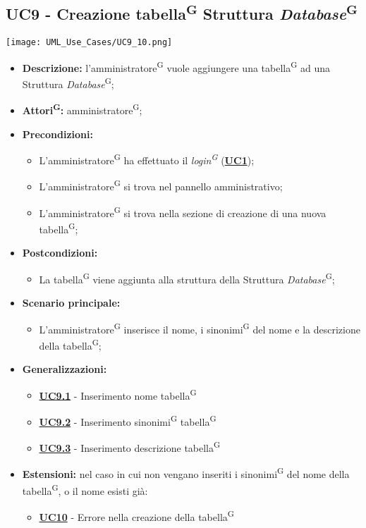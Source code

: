 \subsection{UC9 - Creazione tabella\textsuperscript{G} Struttura \textit{Database}\textsuperscript{G}}
\label{sec:UC9}
\texttt{[image: UML\_Use\_Cases/UC9\_10.png]}
\begin{itemize}
	\item \textbf{Descrizione:} l’amministratore\textsuperscript{G} vuole aggiungere una tabella\textsuperscript{G} ad una Struttura \textit{Database}\textsuperscript{G};
	\item \textbf{Attori\textsuperscript{G}:} amministratore\textsuperscript{G};
	\item \textbf{Precondizioni:} 
	\begin{itemize}
		\item L’amministratore\textsuperscript{G} ha effettuato il \textit{login\textsuperscript{G}} (\hyperref[sec:UC1]{\textbf{UC1}});
		\item L’amministratore\textsuperscript{G} si trova nel pannello amministrativo;
		\item L’amministratore\textsuperscript{G} si trova nella sezione di creazione di una nuova tabella\textsuperscript{G};
	\end{itemize}
	\item \textbf{Postcondizioni:} 
	\begin{itemize}
		\item La tabella\textsuperscript{G} viene aggiunta alla struttura della Struttura \textit{Database}\textsuperscript{G};
	\end{itemize}
	\item \textbf{Scenario principale:} 
	\begin{itemize}
		\item L’amministratore\textsuperscript{G} inserisce il nome, i sinonimi\textsuperscript{G} del nome e la descrizione della tabella\textsuperscript{G};
	\end{itemize}
	\item \textbf{Generalizzazioni:} 
	\begin{itemize}
		\item \hyperref[sec:UC9.1]{\textbf{UC9.1}} - Inserimento nome tabella\textsuperscript{G}
		\item \hyperref[sec:UC9.2]{\textbf{UC9.2}} - Inserimento sinonimi\textsuperscript{G} tabella\textsuperscript{G}
		\item \hyperref[sec:UC9.3]{\textbf{UC9.3}} - Inserimento descrizione tabella\textsuperscript{G}
	\end{itemize}
	\item \textbf{Estensioni:} nel caso in cui non vengano inseriti i sinonimi\textsuperscript{G} del nome della tabella\textsuperscript{G}, o il nome esisti già:
	\begin{itemize}
		\item \hyperref[sec:UC10]{\textbf{UC10}} - Errore nella creazione della tabella\textsuperscript{G}
	\end{itemize}
\end{itemize}

